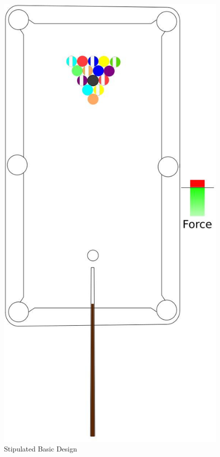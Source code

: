 \documentclass[a4paper,12pt]{article}
\begin{document}
\clearpage

\begin{figure}
	\centering
	\includegraphics[scale = 0.32]{game.jpg}
	\caption{Stipulated Basic Design}
\end{figure}
\end{document}
